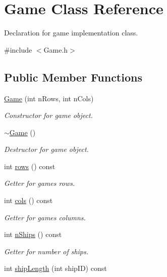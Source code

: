 \hypertarget{class_game}{}\section{Game Class Reference}
\label{class_game}


Declaration for game implementation class.  




{\ttfamily \#include $<$Game.\+h$>$}

\subsection*{Public Member Functions}
\begin{DoxyCompactItemize}
\item 
\mbox{\hyperlink{class_game_a848102f31ba288bac7aa39db4378db7a}{Game}} (int n\+Rows, int n\+Cols)
\begin{DoxyCompactList}\small\item\em Constructor for game object. \end{DoxyCompactList}\item 
\mbox{\hyperlink{class_game_ae3d112ca6e0e55150d2fdbc704474530}{$\sim$\+Game}} ()
\begin{DoxyCompactList}\small\item\em Destructor for game object. \end{DoxyCompactList}\item 
int \mbox{\hyperlink{class_game_a0a0531ce88923b4fbe2b3fea4c9d27f5}{rows}} () const
\begin{DoxyCompactList}\small\item\em Getter for game\textquotesingle{}s rows. \end{DoxyCompactList}\item 
int \mbox{\hyperlink{class_game_afbb769ac9dc75bd26e33a74a3cce5009}{cols}} () const
\begin{DoxyCompactList}\small\item\em Getter for game\textquotesingle{}s columns. \end{DoxyCompactList}\item 
int \mbox{\hyperlink{class_game_a783885809649e4799b199ece36c72be0}{n\+Ships}} () const
\begin{DoxyCompactList}\small\item\em Getter for number of ships. \end{DoxyCompactList}\item 
int \mbox{\hyperlink{class_game_af447d664cda0ae50f98afaa1e75ec0e3}{ship\+Length}} (int ship\+ID) const

\end{DoxyCompactItemize}
